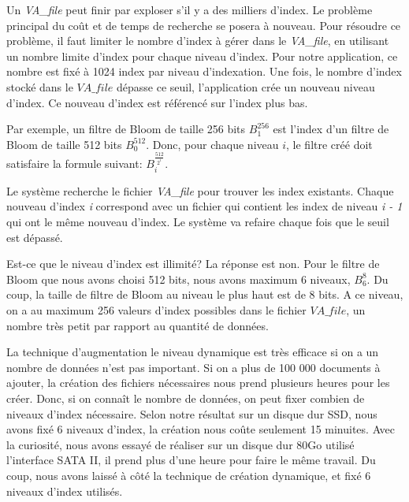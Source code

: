 	Un \textit{VA\_file} peut finir par exploser s'il y a des milliers d'index. Le problème principal du coût et de temps de recherche se posera à nouveau. Pour résoudre ce problème, il faut limiter le nombre d'index à gérer dans le \textit{VA\_file}, en utilisant un nombre limite d'index pour chaque niveau d'index. Pour notre application, ce nombre est fixé à 1024 index par niveau d'indexation. Une fois, le nombre d'index stocké dans le $VA\_file$ dépasse ce seuil, l'application crée un nouveau niveau d'index. Ce nouveau d'index est référencé sur l'index plus bas. 
	
	Par exemple, un filtre de Bloom de taille 256 bits $B^{256}_1$ est l'index d'un filtre de Bloom de taille 512 bits $B^{512}_0$. Donc, pour chaque niveau $i$, le filtre créé doit satisfaire la formule suivant: $B^{\frac{512}{2^i}}_i$. 
	
	Le système recherche le fichier \textit{VA\_file} pour trouver les index existants. Chaque nouveau d'index \textit{i} correspond avec un fichier qui contient les index de niveau \textit{i - 1} qui ont le même nouveau d'index. Le système va refaire chaque fois que le seuil est dépassé.
	
	Est-ce que le niveau d'index est illimité? La réponse est non. Pour le filtre de Bloom que nous avons choisi 512 bits, nous avons maximum 6 niveaux, $B^{8}_6$. Du coup, la taille de filtre de Bloom au niveau le plus haut est de 8 bits. A ce niveau, on a au maximum 256 valeurs d'index possibles dans le fichier $VA\_file$, un nombre très petit par rapport au quantité de données. 
	
	La technique d'augmentation le niveau dynamique est très efficace si on a un nombre de données n'est pas important. Si on a plus de 100 000 documents à ajouter, la création des fichiers nécessaires nous prend plusieurs heures pour les créer. Donc, si on connaît le nombre de données, on peut fixer combien de niveaux d'index nécessaire. Selon notre résultat sur un disque dur SSD, nous avons fixé 6 niveaux d'index, la création nous coûte seulement 15 minuites. Avec la curiosité, nous avons essayé de réaliser sur un disque dur 80Go utilisé l'interface SATA II, il prend plus d'une heure pour faire le même travail. Du coup, nous avons laissé à côté la technique de création dynamique, et fixé 6 niveaux d'index utilisés.	
	
